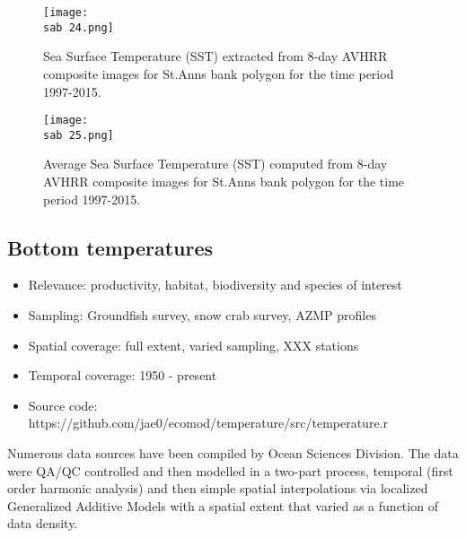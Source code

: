 \documentclass[letterpaper,portrait,11pt]{scrartcl}
\numberwithin{equation}{section}		%
\numberwithin{figure}{section}			%
\numberwithin{table}{section}				%
\newcommand{\ecomod}{\string~/ecomod_data/}   %
\newcommand{\sab}{\ecomod/mpa/sab/}   %
\begin{document}
\begin{figure}[h]
  \centering
  \texttt{[image: \\sab 24.png]}
  \caption{Sea Surface Temperature (SST) extracted from 8-day AVHRR composite images for St.Anns bank polygon for the time period 1997-2015.}
  \label{C}
\end{figure}

\begin{figure}[h]
  \centering
  \texttt{[image: \\sab 25.png]}
  \caption{Average Sea Surface Temperature (SST) computed from 8-day AVHRR composite images for St.Anns bank polygon for the time period 1997-2015.}
  \label{Figure y: }
\end{figure}



\subsection{Bottom temperatures}

\begin{itemize}
  \item Relevance:  productivity, habitat, biodiversity and species of interest
  \item Sampling:  Groundfish survey, snow crab survey, AZMP profiles 
  \item Spatial coverage: full extent, varied sampling, XXX stations
  \item Temporal coverage: 1950 - present
  \item Source code: https://github.com/jae0/ecomod/temperature/src/temperature.r
\end{itemize}

Numerous data sources have been compiled by Ocean Sciences Division. The data were QA/QC controlled and then modelled in a two-part process, temporal (first order harmonic analysis) and then simple spatial interpolations via localized Generalized Additive Models with a spatial extent that varied as a function of data density. 
\end{document}
